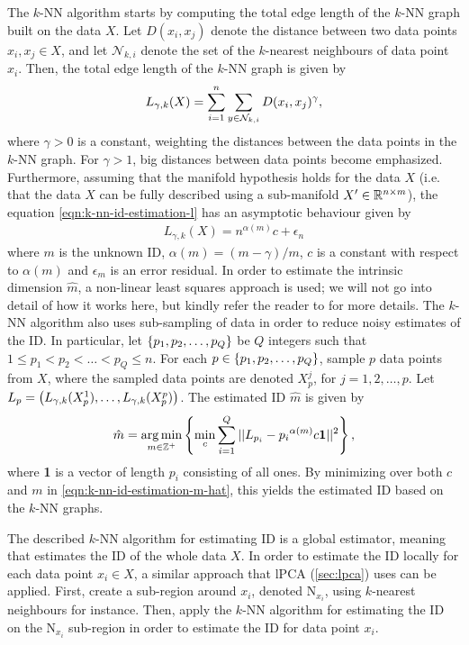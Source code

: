The $k$-NN algorithm starts by computing the total edge length of the $k$-NN graph built on the data $X$. Let $D(x_i, x_j)$ denote the distance between two data points $x_i, x_j \in X$, and let $\mathcal{N}_{k, i}$ denote the set of the $k$-nearest neighbours of data point $x_i$. Then, the total edge length of the $k$-NN graph is given by
\begin{align}
    L_{\gamma, k}(X) = \sum\limits_{i=1}^{n} \sum\limits_{y \in \mathcal{N}_{k, i}}^{} D(x_i, x_j)^\gamma,
    \label{eqn:k-nn-id-estimation-l}
\end{align}
where $\gamma>0$ is a constant, weighting the distances between the data points in the $k$-NN graph. For $\gamma>1$, big distances between data points become emphasized. Furthermore, assuming that the manifold hypothesis holds for the data $X$ (i.e. that the data $X$ can be fully described using a sub-manifold $X' \in \mathbb{R}^{n \times m}$), the equation \cref{eqn:k-nn-id-estimation-l} has an asymptotic behaviour \cite[Equation 2]{Carter2010} given by
\begin{align}
    L_{\gamma, k}(X) = n^{\alpha(m)}c + \epsilon_n
\end{align}
where $m$ is the unknown ID, $\alpha(m) = (m - \gamma)/m$, $c$ is a constant with respect to $\alpha(m)$ and $\epsilon_m$ is an error residual. In order to estimate the intrinsic dimension $\hat{m}$, a non-linear least squares approach is used; we will not go into detail of how it works here, but kindly refer the reader to \cite[p. 651]{Carter2010} for more details. The $k$-NN algorithm also uses sub-sampling of data in order to reduce noisy estimates of the ID. In particular, let $\left\{p_1, p_2, \ldots, p_Q\right\}$ be $Q$ integers such that $1 \leq p_1 < p_2 < \ldots < p_Q \leq n$. For each $p \in \left\{p_1, p_2, \ldots, p_Q\right\}$, sample $p$ data points from $X$, where the sampled data points are denoted $X_p^j$, for $j=1, 2, \ldots, p$. Let $L_p = \left(L_{\gamma, k}(X_p^1), \ldots, L_{\gamma, k}(X_p^p)\right)$. The estimated ID $\hat{m}$ is given by
\begin{align}
    \hat{m} = \operatorname*{arg\,min}_{m \in \mathbb{Z}^{+}} \left\{
        \min_c \sum\limits_{i=1}^{Q} || L_{p_i} - {p_i}^{\alpha(m)}c\textbf{1} ||^2
    \right\},
    \label{eqn:k-nn-id-estimation-m-hat}
\end{align}
where \textbf{1} is a vector of length $p_i$ consisting of all ones. By minimizing over both $c$ and $m$ in \cref{eqn:k-nn-id-estimation-m-hat}, this yields the estimated ID based on the $k$-NN graphs.

The described $k$-NN algorithm for estimating ID is a global estimator, meaning that estimates the ID of the whole data $X$. In order to estimate the ID locally for each data point $x_i \in X$, a similar approach that lPCA (\cref{sec:lpca}) uses can be applied. First, create a sub-region around $x_i$, denoted $\text{N}_{x_i}$, using $k$-nearest neighbours for instance. Then, apply the $k$-NN algorithm for estimating the ID on the $\text{N}_{x_i}$ sub-region in order to estimate the ID for data point $x_i$.

